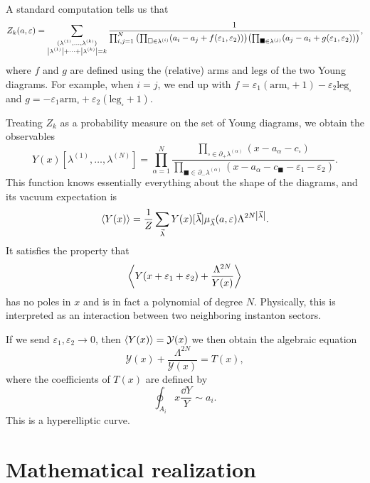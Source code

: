 \documentclass[leqno, openany]{memoir}
\theoremstyle{definition}
\theoremstyle{remark}
\theoremstyle{plain}
\theoremstyle{definition}
\theoremstyle{remark}
\newcommand{\ep}{\varepsilon}
\newcommand{\mc}[1]{\mathcal{#1}}
\newcommand{\mr}[1]{\mathrm{#1}}
\begin{document}
A standard computation tells us that
\[ Z_k(a,\ep) = \sum_{\substack{(\lambda^{(1)}, \ldots, \lambda^{(k)}) \\ \abs{\lambda^{(1)}} + \cdots + \abs{\lambda^{(k)}} = k}} \frac{1}{\prod_{i,j=1}^N \qty( \prod_{\square \in \lambda^{(i)}} (a_i-a_j + f(\ep_1, \ep_2))) \qty(\prod_{\blacksquare \in \lambda^{(j)}} ( a_j - a_i + g(\ep_1, \ep_2) ))}, \]
where $f$ and $g$ are defined using the (relative) arms and legs of the two Young diagrams. For example, when $i=j$, we end up with $f = \ep_1(\mr{arm}_{\square}+1)-\ep_2 \mr{leg}_{\square}$ and $g = -\ep_1 \mr{arm}_{\square} + \ep_2(\mr{leg}_{\square}+1)$.

Treating $Z_k$ as a probability measure on the set of Young diagrams, we obtain the observables
\[ Y(x)[\lambda^{(1)}, \ldots, \lambda^{(N)}] = \prod_{\alpha =1}^N \frac{\prod_{\square \in \partial_+ \lambda^{(\alpha)}}(x-a_{\alpha}-c_{\square})}{\prod_{\blacksquare \in \partial_- \lambda^{(\alpha)}}(x-a_{\alpha}-c_{\blacksquare}-\ep_1-\ep_2)}. \]
This function knows essentially everything about the shape of the diagrams, and its vacuum expectation is
\[ \ev{Y(x)} = \frac{1}{Z} \sum_{\vec{\lambda}} Y(x)[\vec{\lambda}] \mu_{\vec{\lambda}}(a,\ep) \Lambda^{2N\abs{\vec{\lambda}}}. \]
It satisfies the property that
\[ \ev{Y(x+\ep_1 + \ep_2) + \frac{\Lambda^{2N}}{Y(x)}} \]
has no poles in $x$ and is in fact a polynomial of degree $N$. Physically, this is interpreted as an interaction between two neighboring instanton sectors.

If we send $\ep_1, \ep_2 \to 0$, then $\ev{Y(x)} = \mc{Y}(x)$ we then obtain the algebraic equation
\[ \mc{Y}(x) + \frac{\Lambda^{2N}}{\mc{Y}(x)} = T(x), \]
where the coefficients of $T(x)$ are defined by
\[ \oint_{A_i} x \frac{\dd Y}{Y} \sim a_i. \]
This is a hyperelliptic curve.

\section{Mathematical realization}
\end{document}
